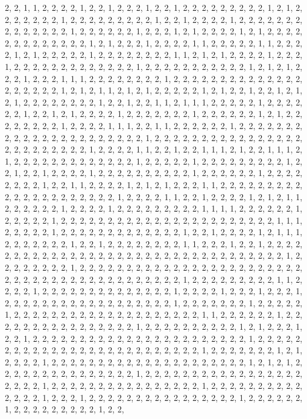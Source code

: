 \documentclass[
]{article}
\begin{document}
\begin{Schunk}
\begin{Soutput}
2, 2, 1, 1, 2, 2, 2, 2, 1, 2, 2, 1, 2, 2, 2, 1, 2, 2, 1, 2, 2, 2, 2, 2, 2, 2, 2, 2, 1, 2, 1, 2, 2, 2, 2, 2, 2, 2, 1, 2, 2, 2, 2, 2, 2, 2, 2, 2, 1, 2, 2, 1, 2, 2, 2, 2, 1, 2, 2, 2, 2, 2, 2, 2, 2, 2, 2, 2, 2, 2, 2, 1, 2, 2, 2, 2, 2, 2, 1, 2, 2, 2, 1, 2, 1, 2, 2, 2, 2, 1, 2, 1, 2, 2, 2, 2, 2, 2, 2, 2, 2, 2, 2, 2, 2, 1, 2, 1, 2, 2, 2, 1, 2, 2, 2, 2, 1, 1, 2, 2, 2, 2, 2, 1, 1, 2, 2, 2, 2, 1, 2, 1, 2, 2, 2, 2, 2, 1, 2, 2, 2, 2, 2, 2, 2, 2, 1, 1, 2, 1, 2, 1, 2, 2, 2, 2, 1, 2, 2, 2, 1, 2, 2, 2, 2, 2, 2, 2, 2, 2, 2, 2, 2, 2, 1, 2, 2, 2, 2, 2, 2, 2, 2, 2, 2, 2, 1, 2, 1, 2, 1, 2, 2, 2, 1, 2, 2, 2, 1, 1, 1, 2, 2, 2, 2, 2, 2, 2, 2, 1, 2, 2, 2, 2, 2, 2, 2, 2, 2, 2, 2, 2, 2, 2, 2, 2, 2, 2, 2, 2, 1, 2, 1, 2, 1, 1, 2, 1, 2, 1, 2, 2, 2, 2, 2, 1, 2, 1, 2, 2, 1, 2, 2, 1, 2, 1, 2, 1, 2, 2, 2, 2, 2, 2, 2, 2, 1, 2, 2, 1, 2, 2, 1, 1, 2, 1, 1, 1, 2, 2, 2, 2, 2, 1, 2, 2, 2, 2, 2, 2, 1, 2, 2, 1, 2, 1, 2, 2, 2, 2, 1, 2, 2, 2, 2, 2, 2, 2, 1, 2, 2, 2, 2, 2, 2, 1, 2, 1, 2, 2, 2, 2, 2, 2, 2, 2, 1, 2, 2, 2, 2, 1, 1, 1, 2, 2, 1, 1, 2, 2, 2, 2, 2, 2, 1, 2, 2, 2, 2, 2, 2, 2, 2, 2, 2, 2, 2, 2, 2, 2, 2, 2, 2, 2, 2, 2, 2, 1, 2, 2, 2, 2, 2, 2, 2, 2, 2, 2, 2, 2, 2, 2, 2, 2, 2, 2, 2, 2, 2, 2, 2, 2, 2, 1, 2, 2, 2, 2, 1, 1, 2, 2, 1, 2, 2, 1, 1, 1, 2, 1, 2, 2, 1, 1, 1, 2, 1, 2, 2, 2, 2, 2, 2, 2, 2, 2, 2, 2, 2, 2, 1, 2, 2, 2, 2, 2, 1, 2, 2, 2, 2, 2, 2, 2, 2, 2, 1, 2, 2, 1, 2, 2, 1, 2, 2, 2, 2, 1, 2, 2, 2, 2, 2, 2, 2, 2, 2, 2, 1, 2, 2, 2, 2, 2, 2, 1, 2, 2, 2, 2, 2, 2, 2, 2, 1, 2, 2, 1, 1, 2, 2, 2, 2, 1, 2, 1, 2, 1, 2, 2, 2, 1, 1, 2, 2, 2, 2, 2, 2, 2, 2, 2, 2, 2, 2, 2, 2, 2, 2, 2, 2, 2, 2, 2, 1, 2, 2, 2, 2, 1, 1, 2, 2, 1, 2, 2, 2, 2, 1, 2, 1, 2, 1, 1, 2, 2, 2, 2, 2, 2, 1, 2, 2, 2, 2, 1, 2, 2, 2, 2, 2, 2, 2, 2, 2, 1, 1, 1, 1, 2, 2, 2, 2, 2, 2, 1, 2, 2, 2, 2, 2, 1, 2, 2, 2, 2, 2, 2, 2, 2, 2, 2, 2, 2, 2, 2, 2, 2, 2, 2, 2, 2, 2, 2, 2, 1, 1, 1, 2, 2, 2, 2, 2, 1, 2, 2, 2, 2, 2, 2, 2, 2, 2, 2, 2, 2, 2, 1, 2, 2, 1, 2, 2, 2, 2, 1, 2, 1, 1, 1, 2, 2, 2, 2, 2, 2, 2, 1, 2, 2, 1, 2, 2, 2, 2, 2, 2, 2, 2, 1, 1, 2, 2, 2, 1, 2, 2, 1, 2, 2, 2, 2, 2, 2, 2, 2, 2, 2, 2, 2, 2, 2, 2, 2, 2, 2, 2, 2, 2, 2, 2, 2, 2, 2, 2, 2, 2, 2, 2, 2, 2, 2, 1, 2, 2, 2, 2, 2, 2, 2, 2, 1, 2, 2, 2, 2, 2, 2, 2, 2, 2, 2, 2, 2, 2, 2, 2, 2, 2, 2, 2, 2, 2, 2, 2, 2, 2, 2, 2, 2, 2, 2, 2, 2, 2, 2, 2, 2, 2, 2, 2, 2, 2, 2, 2, 1, 2, 2, 2, 2, 2, 2, 2, 2, 2, 1, 1, 2, 2, 2, 2, 1, 2, 2, 2, 2, 2, 2, 2, 2, 2, 2, 2, 2, 2, 2, 1, 2, 2, 2, 2, 1, 2, 2, 2, 1, 2, 2, 2, 1, 2, 2, 2, 2, 2, 2, 2, 2, 2, 2, 2, 2, 2, 2, 2, 2, 2, 2, 1, 2, 2, 2, 2, 2, 2, 2, 1, 2, 2, 2, 2, 2, 1, 2, 2, 2, 2, 2, 2, 2, 2, 2, 2, 2, 2, 2, 2, 2, 2, 2, 2, 2, 2, 1, 1, 2, 2, 2, 2, 2, 2, 1, 2, 2, 2, 2, 2, 2, 2, 2, 2, 2, 2, 2, 2, 2, 2, 2, 1, 2, 2, 2, 2, 2, 2, 2, 2, 2, 2, 1, 2, 1, 2, 2, 2, 1, 2, 2, 1, 2, 2, 2, 2, 2, 2, 2, 2, 2, 2, 2, 2, 2, 2, 2, 2, 2, 2, 2, 2, 2, 2, 2, 1, 2, 2, 2, 2, 2, 2, 2, 2, 2, 2, 2, 2, 2, 2, 2, 2, 2, 2, 2, 2, 2, 2, 2, 2, 2, 2, 1, 2, 2, 2, 2, 2, 2, 2, 1, 2, 1, 2, 2, 2, 2, 1, 2, 2, 2, 2, 2, 2, 2, 2, 2, 2, 2, 2, 2, 2, 2, 2, 2, 2, 2, 2, 2, 1, 2, 1, 2, 1, 2, 2, 2, 2, 2, 2, 2, 2, 2, 2, 2, 2, 2, 2, 2, 1, 2, 2, 2, 2, 2, 2, 2, 2, 2, 2, 2, 2, 2, 2, 2, 2, 2, 2, 2, 2, 2, 1, 2, 2, 2, 2, 2, 2, 2, 2, 2, 2, 2, 2, 2, 2, 2, 2, 1, 2, 2, 2, 2, 2, 2, 2, 2, 2, 2, 2, 2, 2, 2, 1, 2, 2, 2, 1, 2, 2, 2, 2, 2, 2, 2, 2, 2, 2, 2, 2, 2, 2, 2, 2, 1, 2, 2, 2, 2, 2, 2, 1, 2, 2, 2, 2, 2, 2, 2, 2, 2, 1, 2, 2, 
\end{Soutput}
\end{Schunk}
\end{document}
